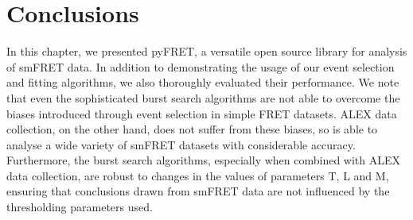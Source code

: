 \section{Conclusions}
In this chapter, we presented pyFRET, a versatile open source library for analysis of smFRET data. In addition to demonstrating the usage of our event selection and fitting algorithms, we also thoroughly evaluated their performance. We note that even the sophisticated burst search algorithms are not able to overcome the biases introduced through event selection in simple FRET datasets. ALEX data collection, on the other hand, does not suffer from these biases, so is able to analyse a wide variety of smFRET datasets with considerable accuracy. Furthermore, the burst search algorithms, especially when combined with ALEX data collection, are robust to changes in the values of parameters T, L and M, ensuring that conclusions drawn from smFRET data are not influenced by the thresholding parameters used.









